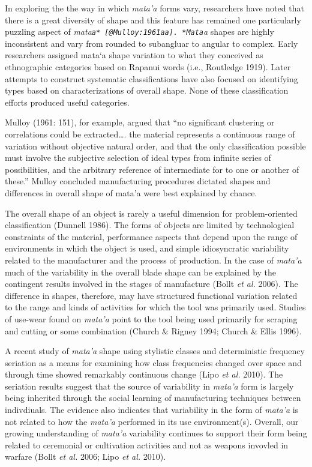 \documentclass[]{article}
\begin{document}
In exploring the the way in which \emph{mata'a} forms vary, researchers
have noted that there is a great diversity of shape and this feature has
remained one particularly puzzling aspect of
\emph{mata\texttt{a* {[}@Mulloy:1961aa{]}. *Mata}a} shapes are highly
inconsistent and vary from rounded to subangluar to angular to complex.
Early researchers assigned mata`a shape variation to what they conceived
as ethnographic categories based on Rapanui words (i.e., Routledge
1919). Later attempts to construct systematic classifications have also
focused on identifying types based on characterizations of overall
shape. None of these classification efforts produced useful categories.

Mulloy (1961: 151), for example, argued that ``no significant clustering
or correlations could be extracted\ldots{}. the material represents a
continuous range of variation without objective natural order, and that
the only classification possible must involve the subjective selection
of ideal types from infinite series of possibilities, and the arbitrary
reference of intermediate for to one or another of these.'' Mulloy
concluded manufacturing procedures dictated shapes and differences in
overall shape of mata'a were best explained by chance.

The overall shape of an object is rarely a useful dimension for
problem-oriented classification (Dunnell 1986). The forms of objects are
limited by technological constraints of the material, performance
aspects that depend upon the range of environments in which the object
is used, and simple idiosyncratic variability related to the
manufacturer and the process of production. In the case of \emph{mata'a}
much of the variability in the overall blade shape can be explained by
the contingent results involved in the stages of manufacture (Bollt
\emph{et al.} 2006). The difference in shapes, therefore, may have
structured functional variation related to the range and kinds of
activities for which the tool was primarily used. Studies of use-wear
found on \emph{mata'a} point to the tool being used primarily for
scraping and cutting or some combination (Church \& Rigney 1994; Church
\& Ellis 1996).

A recent study of \emph{mata'a} shape using stylistic classes and
deterministic frequency seriation as a means for examining how class
frequencies changed over space and through time showed remarkably
continuous change (Lipo \emph{et al.} 2010). The seriation results
suggest that the source of variability in \emph{mata'a} form is largely
being inherited through the social learning of manufacturing techniques
between indivdiuals. The evidence also indicates that variability in the
form of \emph{mata'a} is not related to how the \emph{mata'a} performed
in its use environment(s). Overall, our growing understanding of
\emph{mata'a} variability continues to support their form being related
to ceremonial or cultivation activities and not as weapons invovled in
warfare (Bollt \emph{et al.} 2006; Lipo \emph{et al.} 2010).
\end{document}
